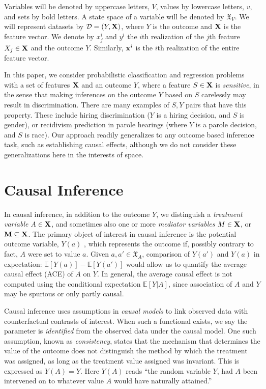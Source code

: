 \documentclass[letterpaper]{article} %
\newcommand{\citep}{\cite}
\begin{document}
Variables will be denoted by uppercase letters, $V$, values by lowercase letters, $v$, and sets by bold letters. A state space of a variable will be denoted by ${\mathfrak X}_V$. We will represent datasets by ${\cal D} = (Y, {\bf X})$, where $Y$ is the outcome and ${\bf X}$ is the feature vector.
We denote by $x^i_j$ and $y^i$ the $i$th realization of the $j$th feature $X_j \in {\bf X}$ and the outcome $Y$.  Similarly,
${\bf x}^i$ is the $i$th realization of the entire feature vector. 

In this paper, we consider probabilistic classification and regression problems with a set of features ${\bf X}$ and an outcome $Y$, where a feature $S \in {\bf X}$ is \emph{sensitive}, in the sense that making inferences on the outcome $Y$ based on $S$ carelessly may result in discrimination. There are many examples of $S,Y$ pairs that have this property.  These include hiring discrimination ($Y$ is a hiring decision, and $S$ is gender), or recidivism prediction in parole hearings (where $Y$ is a parole decision, and $S$ is race). Our approach readily generalizes to any outcome based inference task, such as establishing causal effects, although we do not consider these generalizations here in the interests of space.

\section{Causal Inference}
\label{sec:causal}

In causal inference, in addition to the outcome $Y$, we distinguish a \emph{treatment variable} $A \in {\bf X}$, and sometimes also one or more \emph{mediator variables} $M \in {\bf X}$, or ${\bf M} \subseteq {\bf X}$.  The primary object of interest in causal inference is the potential outcome variable, $Y(a)$ \citep{neyman23app}, which represents the outcome if, possibly contrary to fact, $A$ were set to value $a$. Given $a,a' \in {\mathfrak X}_A$, comparison of $Y(a')$ and $Y(a)$ in expectation: $\mathbb{E}[Y(a)] - \mathbb{E}[Y(a')]$ would allow us to quantify the average causal effect (ACE) of $A$ on $Y$.  In general, the average causal effect is not computed using the conditional expectation $\mathbb{E}[Y | A]$, since association of $A$ and $Y$ may be spurious or only partly causal. 

Causal inference uses assumptions in \emph{causal models} to link observed data with counterfactual contrasts of interest. When such a functional exists, we say the parameter is \emph{identified} from the observed data under the causal model. One such assumption, known as \emph{consistency}, states that the mechanism that determines the value of the outcome does not distinguish the method by which the treatment was assigned, as long as the treatment value assigned was invariant.  This is expressed as $Y(A) = Y$.  Here $Y(A)$ reads ``the random variable $Y$, had $A$ been intervened on to whatever value $A$ would have naturally attained.''  
\end{document}
